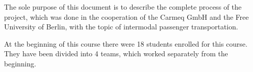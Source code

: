 The sole purpose of this document is to describe the complete process of the project, which was done in the cooperation of the
Carmeq GmbH and the Free University of Berlin, with the topic of intermodal passenger transportation.

\emptyRow
At the beginning of this course there were 18 students enrolled for this course. They have been divided into 4 teams, which
worked separately from the beginning. 